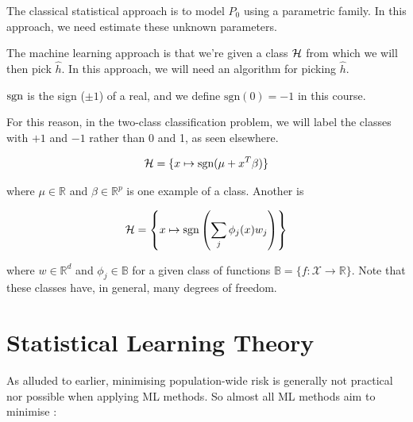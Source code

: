 \documentclass[11pt]{scrartcl}
\begin{document}
The classical statistical approach is to model $P_0$ using a parametric family. In this approach, we need estimate these unknown parameters.

The machine learning approach is that we're given a class $\H$ from which we will then pick $\hat{h}$. In this approach, we will need an algorithm for picking $\hat{h}$.

\begin{definition}
[Sign]

$\text{sgn}$ is the sign ($\pm1$) of a real, and we define $\text{sgn}(0)=-1$ in this course.

For this reason, in the two-class classification problem, we will label the classes with $+1$ and $-1$ rather than 0 and 1, as seen elsewhere.
\end{definition}

\begin{example}[Examples of $\H$]
\begin{equation}
    \mathcal{H} = \{ x \mapsto \text{sgn} (\mu + x^T \beta) \}
    \label{L1:NN H Class}
\end{equation}

where $\mu \in \mathbb{R}$ and $\beta \in \mathbb{R}^p$ is one example of a class. Another is

\begin{equation}
    \mathcal{H} = \left\{ x \mapsto \text{sgn} \left( \sum_{j}
     \phi_j(x) w_j \right) \right\}
    \label{L1:NN H Class Phi}
\end{equation}

where $w \in \mathbb{R}^d$ and $\phi_j \in \mathbb{B}$ for a given class of functions $\mathbb{B} = \{ f : \mathcal{X} \rightarrow \mathbb{R} \}$. Note that these classes have, in general, many degrees of freedom.
\end{example}


\section{Statistical Learning Theory}

As alluded to earlier, minimising population-wide risk is generally not practical nor possible when applying ML methods. So almost all ML methods aim to minimise : %
\end{document}
